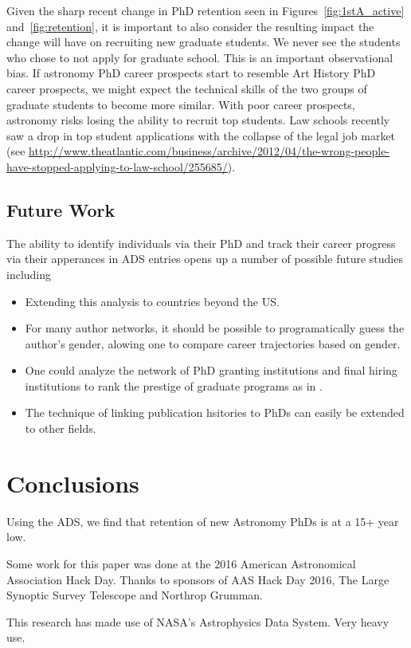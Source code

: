 \documentclass{emulateapj}
\begin{document}
Given the sharp recent change in PhD retention seen in Figures~\ref{fig:1stA_active} and~\ref{fig:retention}, it is important to also consider the resulting impact the change will have on recruiting new graduate students. We never see the students who chose to not apply for graduate school. This is an important observational bias.  If astronomy PhD career prospects start to resemble Art History PhD career prospects, we might expect the technical skills of the two groups of graduate students to become more similar.  With poor career prospects, astronomy risks losing the ability to recruit top students. Law schools recently saw a drop in top student applications with the collapse of the legal job market (see \url{http://www.theatlantic.com/business/archive/2012/04/the-wrong-people-have-stopped-applying-to-law-school/255685/}).  


\subsection{Future Work}

The ability to identify individuals via their PhD and track their career progress via their apperances in ADS entries opens up a number of possible future studies including
\begin{itemize}
\item{Extending this analysis to countries beyond the US.}
\item{For many author networks, it should be possible to programatically guess the author's gender, alowing one to compare career trajectories based on gender.}
\item{One could analyze the network of PhD granting institutions and final hiring institutions to rank the prestige of graduate programs as in \citet{Clausete15}.}
\item{The technique of linking publication hsitories to PhDs can easily be extended to other fields.}
\end{itemize}

\section{Conclusions}
Using the ADS, we find that retention of new Astronomy PhDs is at a 15+ year low.  


\acknowledgments
Some work for this paper was done at the 2016 American Astronomical Association Hack Day. Thanks to sponsors of AAS Hack Day 2016, The Large Synoptic Survey Telescope and Northrop Grumman.

This research has made use of NASA's Astrophysics Data System. Very heavy use.


\end{document}
